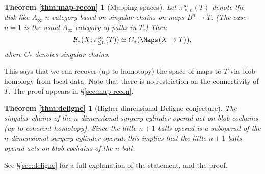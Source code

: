 \newtheorem*{thm:map-recon}{Theorem \ref{thm:map-recon}}

\begin{thm:map-recon}[Mapping spaces]
Let $\pi^\infty_{\le n}(T)$ denote the disk-like $A_\infty$ $n$-category based on singular chains on maps 
$B^n \to T$.
(The case $n=1$ is the usual $A_\infty$-category of paths in $T$.)
Then 
\[
	\bc_*(X; \pi^\infty_{\le n}(T)) \simeq \CM{X}{T},
\]
where $C_*$ denotes singular chains.
\end{thm:map-recon}

This says that we can recover (up to homotopy) the space of maps to $T$ via blob homology from local data. 
Note that there is no restriction on the connectivity of $T$.
The proof appears in \S \ref{sec:map-recon}.

\newtheorem*{thm:deligne}{Theorem \ref{thm:deligne}}

\begin{thm:deligne}[Higher dimensional Deligne conjecture]
The singular chains of the $n$-dimensional surgery cylinder operad act on blob cochains
(up to coherent homotopy).
Since the little $n{+}1$-balls operad is a suboperad of the $n$-dimensional surgery cylinder operad,
this implies that the little $n{+}1$-balls operad acts on blob cochains of the $n$-ball.
\end{thm:deligne}
See \S \ref{sec:deligne} for a full explanation of the statement, and the proof.



